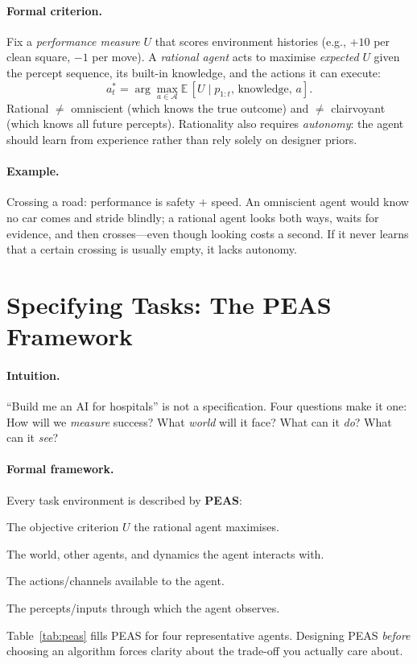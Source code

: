 \paragraph{Formal criterion.} Fix a \emph{performance measure} $U$ that scores environment histories (e.g., $+10$ per clean square, $-1$ per move). A \emph{rational agent} acts to maximise \emph{expected} $U$ given the percept sequence, its built-in knowledge, and the actions it can execute:
\[
a_t^* = \arg\max_{a\in\mathcal{A}} \mathbb{E}\,[U \mid p_{1:t},\, \text{knowledge},\, a].
\]
Rational $\neq$ omniscient (which knows the true outcome) and $\neq$ clairvoyant (which knows all future percepts). Rationality also requires \emph{autonomy}: the agent should learn from experience rather than rely solely on designer priors.

\paragraph{Example.} Crossing a road: performance is safety $+$ speed. An omniscient agent would know no car comes and stride blindly; a rational agent looks both ways, waits for evidence, and then crosses---even though looking costs a second. If it never learns that a certain crossing is usually empty, it lacks autonomy.

\section{Specifying Tasks: The PEAS Framework}
\label{sec:peas}
\paragraph{Intuition.} ``Build me an AI for hospitals'' is not a specification. Four questions make it one: How will we \emph{measure} success? What \emph{world} will it face? What can it \emph{do}? What can it \emph{see}?

\paragraph{Formal framework.} Every task environment is described by \textbf{PEAS}:
\begin{description}[leftmargin=1.2em, itemsep=0.3em]
    \item[P --- Performance measure] The objective criterion $U$ the rational agent maximises.
    \item[E --- Environment] The world, other agents, and dynamics the agent interacts with.
    \item[A --- Actuators] The actions/channels available to the agent.
    \item[S --- Sensors] The percepts/inputs through which the agent observes.
\end{description}
Table~\ref{tab:peas} fills PEAS for four representative agents. Designing PEAS \emph{before} choosing an algorithm forces clarity about the trade-off you actually care about.

